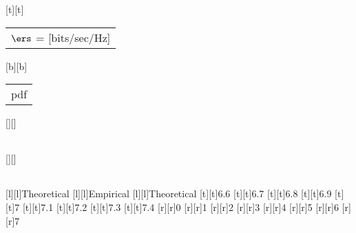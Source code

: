 %    
%
%
%
[t][t]{\fontsize{8}{12}\selectfont \color[rgb]{0.15,0.15,0.15}\setlength{\tabcolsep}{0pt}\begin{tabular}{c}$\ers$ = [bits/sec/Hz]\end{tabular}}%
[b][b]{\fontsize{8}{12}\selectfont \color[rgb]{0,0,0}\setlength{\tabcolsep}{0pt}\begin{tabular}{c}pdf\end{tabular}}%
[][]{\fontsize{10}{15}\selectfont \color[rgb]{0,0,0}\setlength{\tabcolsep}{0pt}\begin{tabular}{c} \end{tabular}}%
[][]{\fontsize{10}{15}\selectfont \color[rgb]{0,0,0}\setlength{\tabcolsep}{0pt}\begin{tabular}{c} \end{tabular}}%
[l][l]{\fontsize{8}{12}\selectfont \color[rgb]{0,0,0}Theoretical}%
[l][l]{\fontsize{8}{12}\selectfont \color[rgb]{0,0,0}Empirical}%
[l][l]{\fontsize{8}{12}\selectfont \color[rgb]{0,0,0}Theoretical}%
%
\fontsize{8}{12}%
\selectfont%
%
[t][t]{6.6}%
[t][t]{6.7}%
[t][t]{6.8}%
[t][t]{6.9}%
[t][t]{7}%
[t][t]{7.1}%
[t][t]{7.2}%
[t][t]{7.3}%
[t][t]{7.4}%
%
[r][r]{0}%
[r][r]{1}%
[r][r]{2}%
[r][r]{3}%
[r][r]{4}%
[r][r]{5}%
[r][r]{6}%
[r][r]{7}%
%
%
